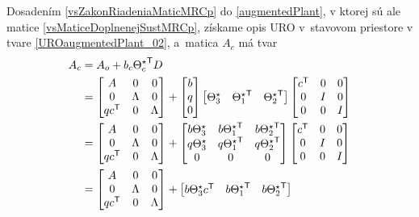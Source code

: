 \documentclass[a4paper, 10pt, ]{article}
\begin{document}
Dosadením \eqref{vsZakonRiadeniaMaticMRCp} do \eqref{augmentedPlant}, v ktorej sú ale matice \eqref{vsMaticeDoplnenejSustMRCp}, získame opis URO v~stavovom priestore v tvare \eqref{UROaugmentedPlant_02}, a~matica
 $A_c$  má tvar
\begin{equation}
	\begin{split}
		A_c &= A_o + b_c {\Theta_c^\star}^{\mathsf{T}} D \\
		&=
        \begin{bmatrix}  A & 0 & 0 \\ 0 & \Lambda & 0 \\ q c^{\mathsf{T}} & 0 & \Lambda \end{bmatrix}
	 	+
	 	\begin{bmatrix} b \\ q\\ 0 \end{bmatrix}
	 	\begin{bmatrix} \Theta_3^\star & {\Theta_1^\star}^{\mathsf{T}} & {\Theta_2^\star}^{\mathsf{T}} \end{bmatrix}
		\begin{bmatrix} c^{\mathsf{T}} & 0 & 0 \\ 0 & I & 0 \\ 0 & 0 & I \end{bmatrix} \\
		&=
        \begin{bmatrix} A & 0 & 0 \\ 0 & \Lambda & 0 \\ q c^{\mathsf{T}} & 0 & \Lambda \end{bmatrix}
	 	+
	 	\begin{bmatrix}
			b \Theta_3^\star & b {\Theta_1^\star}^{\mathsf{T}} & b {\Theta_2^\star}^{\mathsf{T}} \\
			q \Theta_3^\star & q {\Theta_1^\star}^{\mathsf{T}} & q {\Theta_2^\star}^{\mathsf{T}} \\
			0 & 0 & 0
		\end{bmatrix}
		\begin{bmatrix} c^{\mathsf{T}}  & 0 & 0 \\ 0 & I & 0 \\ 0 & 0 & I \end{bmatrix} \\
		&=
		\begin{bmatrix} A & 0 & 0 \\ 0 & \Lambda & 0 \\ q c^{\mathsf{T}} & 0 & \Lambda \end{bmatrix}
	 	+
	 	\begin{bmatrix}
			b \Theta_3^\star c^{\mathsf{T}} & b {\Theta_1^\star}^{\mathsf{T}} & b {\Theta_2^\star}^{\mathsf{T}} \\

\end{bmatrix}
\end{split}
\end{equation}
\end{document}
